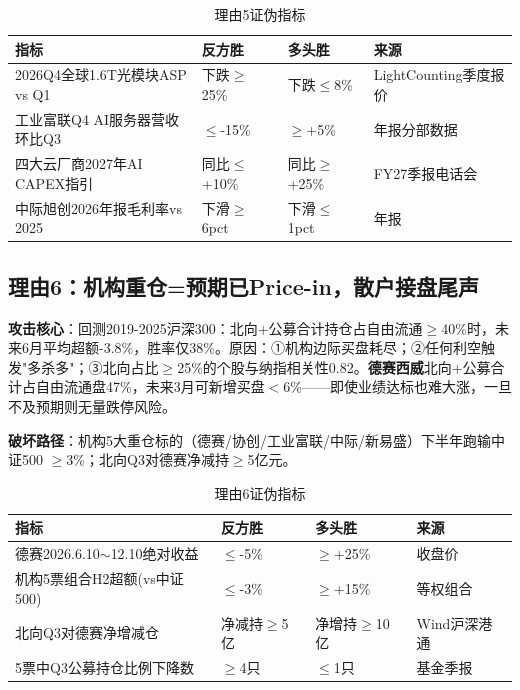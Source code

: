 \begin{table}[H]
\centering\scriptsize
\renewcommand{\arraystretch}{1.1}
\begin{tabularx}{\textwidth}{l X X l}
\toprule
\textbf{指标} & \textbf{反方胜} & \textbf{多头胜} & \textbf{来源} \\
\midrule
2026Q4全球1.6T光模块ASP vs Q1 & 下跌$\geq$25\% & 下跌$\leq$8\% & LightCounting季度报价 \\
工业富联Q4 AI服务器营收环比Q3 & $\leq$-15\% & $\geq$+5\% & 年报分部数据 \\
四大云厂商2027年AI CAPEX指引 & 同比$\leq$+10\% & 同比$\geq$+25\% & FY27季报电话会 \\
中际旭创2026年报毛利率vs 2025 & 下滑$\geq$6pct & 下滑$\leq$1pct & 年报 \\
\bottomrule
\end{tabularx}
\caption{理由5证伪指标}
\end{table}

\subsection{理由6：机构重仓=预期已Price-in，散户接盘尾声}

\textbf{攻击核心}：回测2019-2025沪深300：北向+公募合计持仓占自由流通$\geq$40\%时，未来6月平均超额-3.8\%，胜率仅38\%。原因：①机构边际买盘耗尽；②任何利空触发"多杀多"；③北向占比$\geq$25\%的个股与纳指相关性0.82。\textbf{德赛西威}北向+公募合计占自由流通盘47\%，未来3月可新增买盘$<$6\%——即使业绩达标也难大涨，一旦不及预期则无量跌停风险。

\textbf{破坏路径}：机构5大重仓标的（德赛/协创/工业富联/中际/新易盛）下半年跑输中证500 $\geq$3\%；北向Q3对德赛净减持$\geq$5亿元。

\begin{table}[H]
\centering\scriptsize
\renewcommand{\arraystretch}{1.1}
\begin{tabularx}{\textwidth}{l X X l}
\toprule
\textbf{指标} & \textbf{反方胜} & \textbf{多头胜} & \textbf{来源} \\
\midrule
德赛2026.6.10$\sim$12.10绝对收益 & $\leq$-5\% & $\geq$+25\% & 收盘价 \\
机构5票组合H2超额(vs中证500) & $\leq$-3\% & $\geq$+15\% & 等权组合 \\
北向Q3对德赛净增减仓 & 净减持$\geq$5亿 & 净增持$\geq$10亿 & Wind沪深港通 \\
5票中Q3公募持仓比例下降数 & $\geq$4只 & $\leq$1只 & 基金季报 \\
\bottomrule
\end{tabularx}
\caption{理由6证伪指标}
\end{table}

